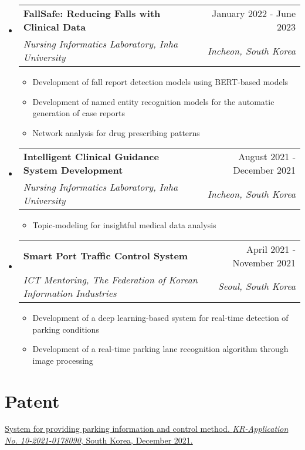 \documentclass[letterpaper,11pt]{article}
\makeatletter
\newcommand{\resumeSubheading}[4]{
  \vspace{-1pt}\item
    \begin{tabular*}{0.97\textwidth}{l@{\extracolsep{\fill}}r}
      #1 & #2 \\
      \textit{\small#3} & \textit{\small #4} \\
    \end{tabular*}\vspace{-5pt}
}
\makeatother
\begin{document}
\begin{itemize}[leftmargin=*,label=]
        \resumeSubheading
        {\textbf{FallSafe: Reducing Falls with Clinical Data}}{January 2022 - June 2023}
            {Nursing Informatics Laboratory, Inha University}{Incheon, South Korea}
            \begin{itemize}[label=\bullet]
                \item{Development of fall report detection models using BERT-based models}
                \item{Development of named entity recognition models for the automatic generation of case reports}
                \item{Network analysis for drug prescribing patterns}
            \end{itemize}
        \resumeSubheading
        {\textbf{Intelligent Clinical Guidance System Development}}{August 2021 - December 2021}
            {Nursing Informatics Laboratory, Inha University}{Incheon, South Korea}
            \begin{itemize}[label=\bullet]
                \item{Topic-modeling for insightful medical data analysis}
            \end{itemize}
        \resumeSubheading
        {\textbf{Smart Port Traffic Control System}}{April 2021 - November 2021}
            {ICT Mentoring, The Federation of Korean Information Industries}{Seoul, South Korea}
            \begin{itemize}[label=\bullet]
                \item{Development of a deep learning-based system for real-time detection of parking conditions}
                \item{Development of a real-time parking lane recognition algorithm through image processing}
            \end{itemize}
    \end{itemize}


    \section{Patent}
    \begin{enumerate}[noitemsep, leftmargin=*,label={[\arabic*]}]
        \item{\href{https://doi.org/10.8080/1020210178090}{System for providing parking information and control method. \textit{KR-Application No. 10-2021-0178090}, South Korea, December 2021.}}
    \end{enumerate}
\end{document}
